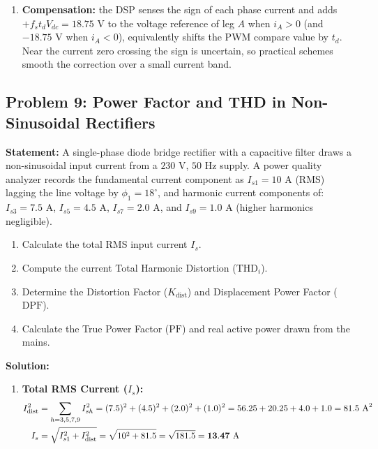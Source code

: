 \documentclass[11pt,a4paper]{article}
\let\origsubsection\subsection
\renewcommand{\subsection}{\Needspace{7\baselineskip}\origsubsection}
\begin{document}
\begin{examplebox}
\begin{enumerate}
  \item \textbf{Compensation:} the DSP senses the sign of each phase current and adds $+f_s t_d V_{dc} = 18.75\text{ V}$ to the voltage reference of leg $A$ when $i_A > 0$ (and $-18.75\text{ V}$ when $i_A < 0$), equivalently shifts the PWM compare value by $t_d$. Near the current zero crossing the sign is uncertain, so practical schemes smooth the correction over a small current band.
\end{enumerate}
\end{examplebox}

\subsection{Problem 9: Power Factor and THD in Non-Sinusoidal Rectifiers}
\begin{examplebox}
\textbf{Statement:} A single-phase diode bridge rectifier with a capacitive filter draws a non-sinusoidal input current from a $230\text{ V}$, $50\text{ Hz}$ supply. A power quality analyzer records the fundamental current component as $I_{s1} = 10\text{ A}$ (RMS) lagging the line voltage by $\phi_1 = 18^\circ$, and harmonic current components of: $I_{s3} = 7.5\text{ A}$, $I_{s5} = 4.5\text{ A}$, $I_{s7} = 2.0\text{ A}$, and $I_{s9} = 1.0\text{ A}$ (higher harmonics negligible).
\begin{enumerate}
  \item Calculate the total RMS input current $I_s$.
  \item Compute the current Total Harmonic Distortion ($\text{THD}_i$).
  \item Determine the Distortion Factor ($K_{\text{dist}}$) and Displacement Power Factor ($\text{DPF}$).
  \item Calculate the True Power Factor ($\text{PF}$) and real active power drawn from the mains.
\end{enumerate}

\tcblower
\textbf{Solution:}
\begin{enumerate}
  \item \textbf{Total RMS Current ($I_s$):}
  \begin{align*}
  I_{\text{dist}}^2 &= \sum_{h=3,5,7,9} I_{sh}^2 = (7.5)^2 + (4.5)^2 + (2.0)^2 + (1.0)^2 = 56.25 + 20.25 + 4.0 + 1.0 = 81.5\text{ A}^2 \notag\\
  I_s &= \sqrt{I_{s1}^2 + I_{\text{dist}}^2} = \sqrt{10^2 + 81.5} = \sqrt{181.5} = \mathbf{13.47\text{ A}}
  \end{align*}


\end{enumerate}
\end{examplebox}
\end{document}

